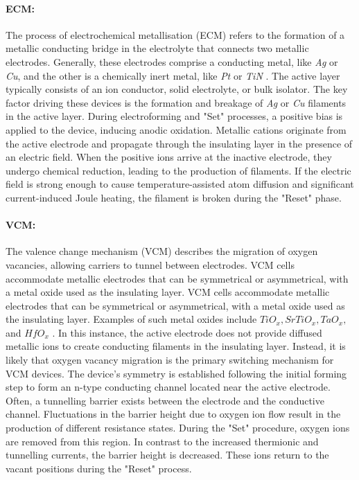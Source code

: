 \paragraph{ECM:} The process of electrochemical metallisation (ECM) refers to the formation of a metallic conducting bridge in the electrolyte that connects two metallic electrodes. Generally, these electrodes comprise a conducting metal, like \textit{Ag} or \textit{Cu}, and the other is a chemically inert metal, like \textit{Pt} or \textit{TiN} \cite{waser2010nanoionics}.  The active layer typically consists of an ion conductor, solid electrolyte, or bulk isolator. The key factor driving these devices is the formation and breakage of \textit{Ag} or \textit{Cu} filaments in the active layer. During electroforming and "Set" processes, a positive bias is applied to the device, inducing anodic oxidation. Metallic cations originate from the active electrode and propagate through the insulating layer in the presence of an electric field. When the positive ions arrive at the inactive electrode, they undergo chemical reduction, leading to the production of filaments. If the electric field is strong enough to cause temperature-assisted atom diffusion and significant current-induced Joule heating, the filament is broken during the "Reset" phase.

\paragraph{VCM:} The valence change mechanism (VCM) describes the migration of oxygen vacancies, allowing carriers to tunnel between electrodes. VCM cells accommodate metallic electrodes that can be symmetrical or asymmetrical, with a metal oxide used as the insulating layer.  VCM cells accommodate metallic electrodes that can be symmetrical or asymmetrical, with a metal oxide used as the insulating layer. Examples of such metal oxides include \textit{$TiO_x, SrTiO_x, TaO_x,$} and \textit{$HfO_x$} \cite{lee2010evidence}. In this instance, the active electrode does not provide diffused metallic ions to create conducting filaments in the insulating layer. Instead, it is likely that oxygen vacancy migration is the primary switching mechanism for VCM devices. The device's symmetry is established following the initial forming step to form an n-type conducting channel located near the active electrode. Often, a tunnelling barrier exists between the electrode and the conductive channel. Fluctuations in the barrier height due to oxygen ion flow result in the production of different resistance states. During the "Set" procedure, oxygen ions are removed from this region. In contrast to the increased thermionic and tunnelling currents, the barrier height is decreased. These ions return to the vacant positions during the "Reset" process.

